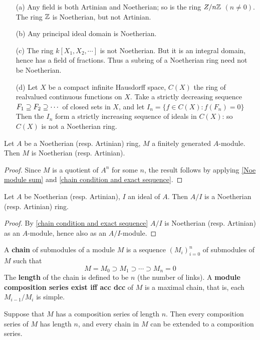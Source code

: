 \begin{example}
\mbox{}
\begin{itemize}
\item[(a)] Any field is both Artinian and Noetherian; so is the ring $Z/n\mathbb{Z}$ $(n\neq 0)$. The ring $\mathbb{Z}$ is Noetherian, but not Artinian.
\item[(b)] Any principal ideal domain is Noetherian.
\item[(c)] The ring $k[X_1,X_2,\cdots]$ is not Noetherian. But it is an integral domain, hence has a field of fractions. Thus a subring of a Noetherian
ring need not be Noetherian.
\item[(d)] Let $X$ be a compact infinite Hausdorff space, $C(X)$ the ring of realvalued continuous functions on $X$. Take a strictly decreasing sequence $F_1\supseteq F_2\supseteq\cdots$ of closed sets in $X$, and let $I_n=\{f\in C(X):f(F_n)=0\}$ Then the $I_n$ form a strictly increasing sequence of ideals in $C(X)$: so $C(X)$ is not a Noetherian ring.
\end{itemize}
\end{example}
\begin{proposition}\label{Noe finite module is Noe}
Let $A$ be a Noetherian (resp. Artinian) ring, $M$ a finitely generated $A$-module. Then $M$ is Noetherian (resp. Artinian).
\end{proposition}
\begin{proof}
Since $M$ is a quotient of $A^n$ for some $n$, the result follows by applying \cref{Noe module sum} and \cref{chain condition and exact sequence}.
\end{proof}
\begin{proposition}\label{Noe quotient ring}
Let $A$ be Noetherian (resp. Artinian), $I$ an ideal of $A$. Then $A/I$ is a Noetherian (resp. Artinian) ring.
\end{proposition}
\begin{proof}
By \cref{chain condition and exact sequence} $A/I$ is Noetherian (resp. Artinian) as an $A$-module, hence also as an $A/I$-module.
\end{proof}
A \textbf{chain} of submodules of a module $M$ is a sequence $(M_i)_{i=0}^{n}$ of submodules of $M$ such that
\[M=M_0\supset M_1\supset\cdots\supset M_n=0\]
The \textbf{length} of the chain is defined to be $n$ (the number of links). A \textbf{module composition series exist iff acc dcc} of $M$ is a maximal chain, that is, each $M_{i-1}/M_{i}$ is simple.
\begin{proposition}\label{module composition series length unique}
Suppose that $M$ has a composition series of length $n$. Then every composition series of $M$ has length $n$, and every chain in $M$ can be extended to a composition series.
\end{proposition}
